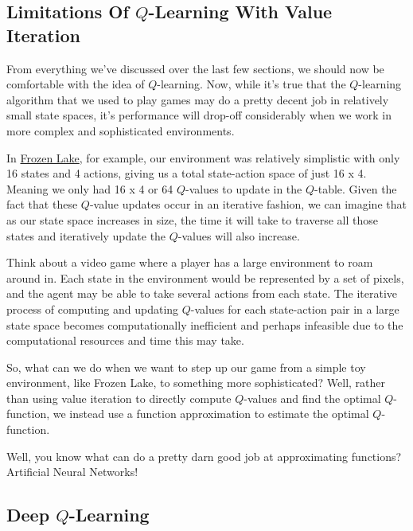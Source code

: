\subsection{Limitations Of $Q$-Learning With Value Iteration}

From everything we've discussed over the last few sections, we should now be comfortable 
with the idea of $Q$-learning. Now, while it's true that the $Q$-learning algorithm that 
we used to play games may do a pretty decent job in relatively small state spaces, it's 
performance will drop-off considerably when we work in more complex and sophisticated 
environments.

In \href{https://deeplizard.com/learn/video/QK_PP_2KgGE}{Frozen Lake}, for example, our 
environment was relatively simplistic with only 16 states and 4 actions, giving us a 
total state-action space of just 16 x 4. Meaning we only had 16 x 4 or 64 $Q$-values to 
update in the $Q$-table. Given the fact that these $Q$-value updates occur in an iterative 
fashion, we can imagine that as our state space increases in size, the time it will take 
to traverse all those states and iteratively update the $Q$-values will also increase.

Think about a video game where a player has a large environment to roam around in. Each 
state in the environment would be represented by a set of pixels, and the agent may be 
able to take several actions from each state. The iterative process of computing and 
updating $Q$-values for each state-action pair in a large state space becomes 
computationally inefficient and perhaps infeasible due to the computational resources 
and time this may take.

So, what can we do when we want to step up our game from a simple toy environment, like 
Frozen Lake, to something more sophisticated? Well, rather than using value iteration to 
directly compute $Q$-values and find the optimal $Q$-function, we instead use a function 
approximation to estimate the optimal $Q$-function.

Well, you know what can do a pretty darn good job at approximating functions? Artificial 
Neural Networks!


\subsection{Deep $Q$-Learning}


